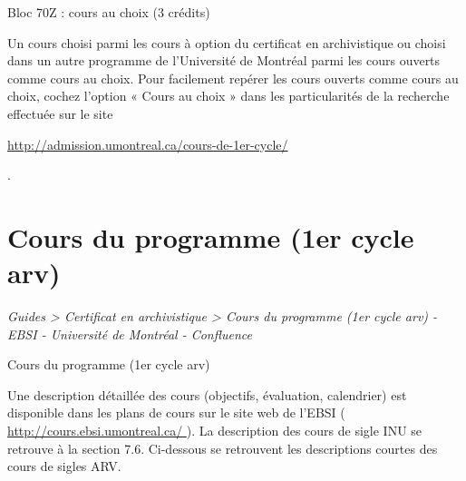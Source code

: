 \documentclass [12 pt]{article}
\begin{document}
                        
                        
                            
                                Bloc 70Z : cours au choix (3 crédits)
                            
                        
                        
                            
                                Un cours choisi parmi les cours à option du certificat en
                                    archivistique ou choisi dans un autre programme de l'Université
                                    de Montréal parmi les cours ouverts comme cours au choix. Pour
                                    facilement repérer les cours ouverts comme cours au choix,
                                    cochez l'option « Cours au choix » dans les particularités de la
                                    recherche effectuée sur le site 
                                
        \href{
        http://admission.umontreal.ca/cours-de-1er-cycle/
        } {
        http://admission.umontreal.ca/cours-de-1er-cycle/
        }
    
                                .
                            
                        
                    
                
            
        
    
    
        \newpage
        \section {
        Cours du programme (1er cycle arv)
        }
        
        
        
        \textit{
        Guides > Certificat en archivistique > Cours du programme (1er cycle arv) -
            EBSI - Université de Montréal - Confluence
        }
    
        Cours du programme (1er cycle arv)
        
            Une description détaillée des cours (objectifs, évaluation, calendrier) est
                disponible dans les plans de cours sur le site web de l'EBSI (
        \href{
        http://cours.ebsi.umontreal.ca/
        } {
        http://cours.ebsi.umontreal.ca/
        }
    ). La description des cours de sigle INU se
                retrouve à la section 7.6. Ci-dessous se retrouvent les descriptions courtes des
                cours de sigles ARV.
            
\end{document}
